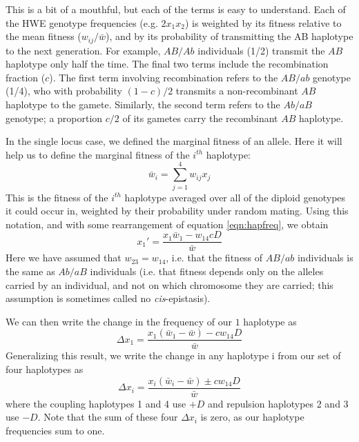 This is a bit of a mouthful, but each of the terms is easy to understand. Each of the HWE genotype frequencies (e.g. $2x_1x_2$) is weighted by its fitness relative to the mean fitness ($w_{ij}/\bar{w}$), and by its probability of transmitting the AB haplotype to the next generation. For example, $AB/Ab$ individuals (1/2) transmit the $AB$ haplotype only half the time. The final two terms include the recombination fraction ($c$). The first term involving recombination refers to the $AB/ab$ genotype (1/4), who with probability $(1-c)/2$ transmits a non-recombinant $AB$ haplotype to the gamete. Similarly, the second term refers to the  $Ab/aB$ genotype; a proportion $c/2$ of its gametes carry the recombinant $AB$ haplotype. 

In the single locus case, we defined the marginal fitness of an allele. Here it will help us to define the marginal fitness of the $i^{th}$ haplotype:
\begin{equation}
\bar{w}_i = \sum_{j=1}^4 w_{ij} x_j
\end{equation}
This is the fitness of the $i^{th}$ haplotype averaged over all of the diploid genotypes it could occur in, weighted by their probability under random mating. Using this notation, and with some rearrangement of equation \eqref{eqn:hapfreq}, we obtain
\begin{equation}
x_1' = \frac{x_1\bar{w}_1 - w_{14} c D}{\bar{w}}
\end{equation}
Here we have assumed that $w_{23}=w_{14}$, i.e. that the fitness of $AB/ab$ individuals is the same as $Ab/aB$ individuals (i.e. that fitness depends only on the alleles carried by an individual, and not on which chromosome they are carried; this assumption is sometimes called no {\it cis}-epistasis). 

We can then write the change in the frequency of our $1$ haplotype as 
\begin{equation}
\Delta x_1= \frac{x_1(\bar{w}_1-\bar{w}) -c w_{14} D}{\bar{w}}
\end{equation}
Generalizing this result, we write the change in any haplotype i from our set of four haplotypes as
\begin{equation}
\Delta x_i= \frac{x_i(\bar{w}_i-\bar{w}) \pm c w_{14} D}{\bar{w}}  \label{eqn:two_loc_sel}
\end{equation}
where the coupling haplotypes 1 and 4 use $+D$ and repulsion haplotypes 2 and 3 use $-D$.  Note that the sum of these four $\Delta x_i$ is zero, as our haplotype frequencies sum to one.

